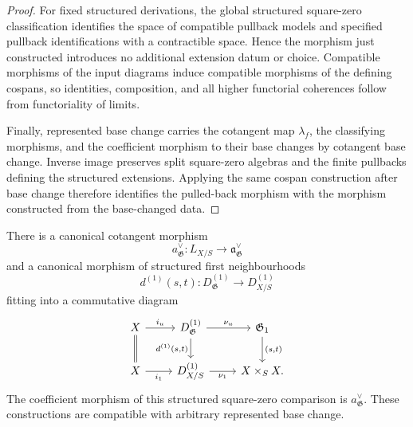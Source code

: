 \begin{proof}
For fixed structured derivations, the global structured square-zero
classification identifies the space of compatible pullback models and
specified pullback identifications with a contractible space.  Hence the
morphism just constructed introduces no additional extension datum or
choice.  Compatible morphisms of the input diagrams induce compatible
morphisms of the defining cospans, so identities, composition, and all higher
functorial coherences follow from functoriality of limits.

Finally, represented base change carries the cotangent map
$\lambda_f$, the classifying morphisms, and the coefficient morphism to their
base changes by cotangent base change.  Inverse image preserves split
square-zero algebras and the finite pullbacks defining the structured
extensions.  Applying the same cospan construction after base change
therefore identifies the pulled-back morphism with the morphism constructed
from the base-changed data.
\end{proof}


\begin{proposition}
\label{prop:first-order-source-target-comparison}
There is a canonical cotangent morphism
\[
    a_{\mathfrak G}^{\vee}:
    L_{X/S}
    \longrightarrow
    \mathfrak a_{\mathfrak G}^{\vee}
\]
and a canonical morphism of structured first neighbourhoods
\[
    d^{(1)}(s,t):
    D^{(1)}_{\mathfrak G}
    \longrightarrow
    D^{(1)}_{X/S}
\]
fitting into a commutative diagram
\[
\begin{tikzcd}
X \arrow[r,"i_u"] \arrow[d,equal] &
D^{(1)}_{\mathfrak G}
    \arrow[r,"\nu_u"]
    \arrow[d,"{d^{(1)}(s,t)}"']
&
\mathfrak G_1
    \arrow[d,"{(s,t)}"]
\\
X \arrow[r,"i_1"'] &
D^{(1)}_{X/S}
    \arrow[r,"\nu_1"']
&
X\times_SX .
\end{tikzcd}
\]
The coefficient morphism of this structured square-zero comparison is
$a_{\mathfrak G}^{\vee}$.  These constructions are compatible with arbitrary
represented base change.
\end{proposition}

